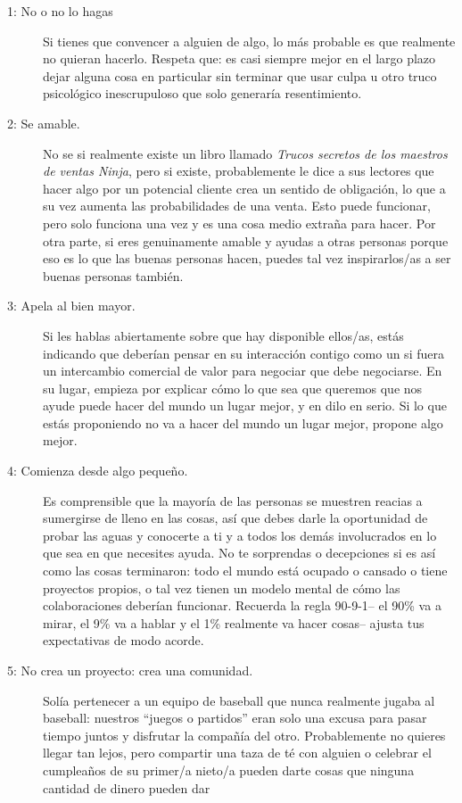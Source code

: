 \begin{description}

\item[1: No o no lo hagas]

Si tienes que convencer a alguien de algo,
lo más probable es que realmente no quieran hacerlo.
Respeta que:
es casi siempre mejor en el largo plazo dejar alguna cosa en particular sin terminar
que usar culpa u otro truco psicológico inescrupuloso que solo generaría resentimiento.


\item[2: Se amable.]
No se si realmente existe un libro llamado
 \emph{Trucos secretos de los maestros de ventas Ninja},
pero si existe,
probablemente le dice a sus lectores que hacer algo por un potencial cliente
crea un sentido de obligación,
lo que a su vez aumenta las probabilidades de una venta.
Esto puede funcionar, pero solo funciona una vez y es una cosa medio extraña para hacer.
Por otra parte,
si eres genuinamente amable
y ayudas a otras personas porque eso es lo que las buenas personas hacen,
puedes tal vez inspirarlos/as a ser buenas personas también.


\item[3: Apela al bien mayor.]
Si les hablas abiertamente sobre que hay disponible ellos/as,
estás indicando que deberían pensar en su interacción contigo
como un  si fuera un intercambio comercial de valor para negociar que debe negociarse.
En su lugar,
empieza por explicar cómo lo que sea que queremos que nos ayude puede hacer del mundo un lugar mejor, y en dilo en serio.
Si lo que estás proponiendo no va a hacer del mundo un lugar mejor,
propone algo mejor.

\item[4: Comienza desde algo pequeño.]
Es comprensible que la mayoría de las personas se muestren reacias a sumergirse de lleno en las cosas, 
así que debes darle  la oportunidad de probar las aguas 
y conocerte a ti y a todos los demás involucrados
 en lo que sea en  que necesites ayuda.
No te sorprendas o decepciones si es así como las cosas terminaron:
todo el mundo está ocupado o cansado o tiene proyectos propios,
o tal vez tienen un modelo mental de cómo las colaboraciones deberían funcionar.
Recuerda la regla  90-9-1-- el 90\% va a mirar,
el 9\% va a hablar 
y el 1\% realmente va hacer cosas-- ajusta tus expectativas de modo acorde.

\item[5: No crea un proyecto: crea una comunidad.]
Solía pertenecer a un equipo de baseball que nunca realmente jugaba al baseball:
nuestros ``juegos o partidos'' eran solo una excusa para pasar tiempo juntos y disfrutar la compañía del otro.
Probablemente no quieres llegar tan lejos,
pero compartir una taza de té con alguien o celebrar el cumpleaños de su primer/a nieto/a
pueden darte cosas que ninguna cantidad de dinero pueden dar


\end{description}
